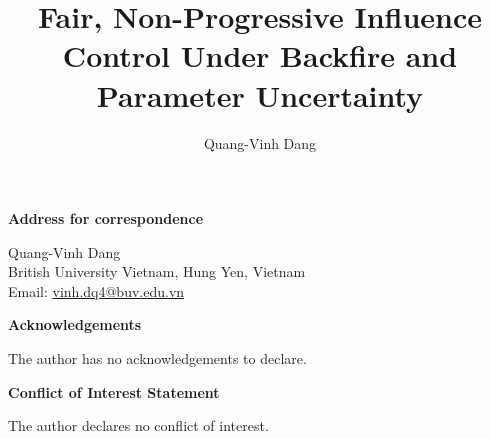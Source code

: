 \documentclass[11pt]{article}
\title{\LARGE Fair, Non-Progressive Influence Control Under Backfire and
Parameter Uncertainty}
\author[1]{Quang-Vinh Dang}
\affil[1]{British University Vietnam, Hung Yen, Vietnam}
\date{}
\begin{document}
\maketitle
\thispagestyle{empty}

\vspace{-3em}

\noindent\textbf{Address for correspondence}

\noindent Quang-Vinh Dang \\
British University Vietnam, Hung Yen, Vietnam \\
Email: \href{mailto:vinh.dq4@buv.edu.vn}{vinh.dq4@buv.edu.vn}

\vspace{1.5em}

\noindent\textbf{Acknowledgements}

\noindent The author has no acknowledgements to declare.

\vspace{1.5em}

\noindent\textbf{Conflict of Interest Statement}

\noindent The author declares no conflict of interest.
\end{document}
